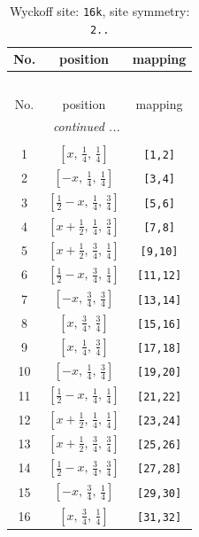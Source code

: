 \documentclass[fleqn,8pt]{jsarticle}
\begin{document}
\renewcommand{\arraystretch}{1.2}
\begin{longtable}{ccc}
\caption{Wyckoff site: {\tt 16k}, site symmetry: {\tt 2..}}
 \\
 \hline \hline
No. & position & mapping \\ \hline \endfirsthead

\multicolumn{2}{l}{\tablename\ \thetable{}} \\
 \hline \hline
No. & position & mapping \\ \hline \endhead

 \hline \hline
\multicolumn{2}{r}{\footnotesize\it continued ...} \\ \endfoot

 \hline \hline
\multicolumn{2}{r}{} \\ \endlastfoot

1 & $\left[ x,\, \frac{1}{4},\, \frac{1}{4} \right]$ & {\tt [1,2]} \\ \hline
2 & $\left[ - x,\, \frac{1}{4},\, \frac{1}{4} \right]$ & {\tt [3,4]} \\ \hline
3 & $\left[ \frac{1}{2} - x,\, \frac{1}{4},\, \frac{3}{4} \right]$ & {\tt [5,6]} \\ \hline
4 & $\left[ x + \frac{1}{2},\, \frac{1}{4},\, \frac{3}{4} \right]$ & {\tt [7,8]} \\ \hline
5 & $\left[ x + \frac{1}{2},\, \frac{3}{4},\, \frac{1}{4} \right]$ & {\tt [9,10]} \\ \hline
6 & $\left[ \frac{1}{2} - x,\, \frac{3}{4},\, \frac{1}{4} \right]$ & {\tt [11,12]} \\ \hline
7 & $\left[ - x,\, \frac{3}{4},\, \frac{3}{4} \right]$ & {\tt [13,14]} \\ \hline
8 & $\left[ x,\, \frac{3}{4},\, \frac{3}{4} \right]$ & {\tt [15,16]} \\ \hline
9 & $\left[ x,\, \frac{1}{4},\, \frac{3}{4} \right]$ & {\tt [17,18]} \\ \hline
10 & $\left[ - x,\, \frac{1}{4},\, \frac{3}{4} \right]$ & {\tt [19,20]} \\ \hline
11 & $\left[ \frac{1}{2} - x,\, \frac{1}{4},\, \frac{1}{4} \right]$ & {\tt [21,22]} \\ \hline
12 & $\left[ x + \frac{1}{2},\, \frac{1}{4},\, \frac{1}{4} \right]$ & {\tt [23,24]} \\ \hline
13 & $\left[ x + \frac{1}{2},\, \frac{3}{4},\, \frac{3}{4} \right]$ & {\tt [25,26]} \\ \hline
14 & $\left[ \frac{1}{2} - x,\, \frac{3}{4},\, \frac{3}{4} \right]$ & {\tt [27,28]} \\ \hline
15 & $\left[ - x,\, \frac{3}{4},\, \frac{1}{4} \right]$ & {\tt [29,30]} \\ \hline
16 & $\left[ x,\, \frac{3}{4},\, \frac{1}{4} \right]$ & {\tt [31,32]} \\
\end{longtable}
\end{document}
